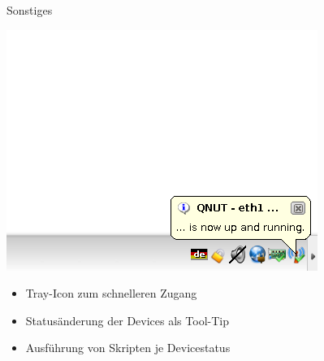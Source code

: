 \begin{frame}[<+-| alert@+>]{Sonstiges}

	\includegraphics[scale=0.25]{qnut_tooltip.png}

	\begin{itemize}
		\item Tray-Icon zum schnelleren Zugang
		\item Statusänderung der Devices als Tool-Tip
		\item Ausführung von Skripten je Devicestatus
	\end{itemize}
\end{frame}



